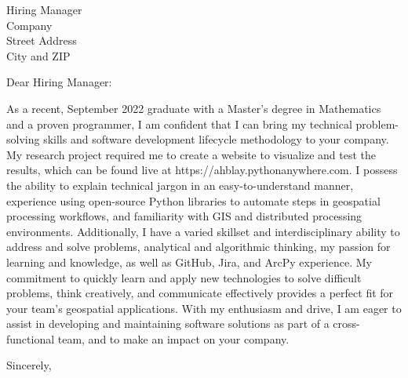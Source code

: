\documentclass{letter}%
\begin{document}
%
\normalsize%
\begin{letter}{Hiring Manager \\ Company \\ Street Address \\ City and ZIP}%
\opening{Dear Hiring Manager:}%

As a recent, September 2022 graduate with a Master's degree in Mathematics and a proven programmer, I am confident that I can bring my technical problem-solving skills and software development lifecycle methodology to your company. My research project required me to create a website to visualize and test the results, which can be found live at https://ahblay.pythonanywhere.com. I possess the ability to explain technical jargon in an easy-to-understand manner, experience using open-source Python libraries to automate steps in geospatial processing workflows, and familiarity with GIS and distributed processing environments. Additionally, I have a varied skillset and interdisciplinary ability to address and solve problems, analytical and algorithmic thinking, my passion for learning and knowledge, as well as GitHub, Jira, and ArcPy experience. 
My commitment to quickly learn and apply new technologies to solve difficult problems, think creatively, and communicate effectively provides a perfect fit for your team's geospatial applications. With my enthusiasm and drive, I am eager to assist in developing and maintaining software solutions as part of a cross-functional team, and to make an impact on your company.%
\closing{Sincerely,}%
%
\end{letter}%
\end{document}
